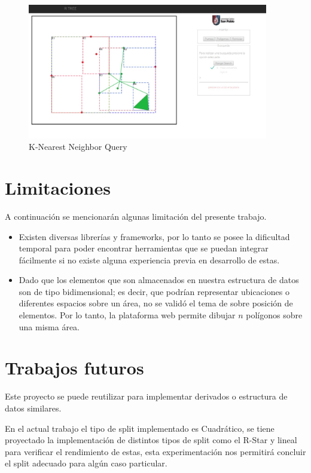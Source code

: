 \documentclass[a4paper]{article}
\begin{document}
\begin{figure}[ht]
\centering
  \includegraphics[width=10.5cm]{images/KNEAR.jpeg}
  \caption{K-Nearest Neighbor Query}
  \label{fig5}
\end{figure}

\newpage

\section{Limitaciones}
A continuación se mencionarán algunas limitación del presente trabajo.\\
\begin{itemize}
    \item Existen diversas librerías y frameworks, por lo tanto se posee la dificultad temporal para poder encontrar herramientas que se puedan integrar fácilmente si no existe alguna experiencia previa en desarrollo de estas.
\end{itemize}

\begin{itemize}
    \item Dado que los elementos que son almacenados en nuestra estructura de datos son de tipo bidimensional; es decir, que podrían representar ubicaciones o diferentes espacios sobre un área, no se validó el tema de sobre posición de elementos. Por lo tanto, la plataforma web permite dibujar $n$ polígonos sobre una misma área.
\end{itemize}
\section{Trabajos futuros}

Este proyecto se puede reutilizar para implementar derivados o estructura de datos similares.

En el actual trabajo el tipo de split implementado es Cuadrático,  se tiene proyectado la implementación de distintos tipos de split  como el R-Star y lineal para verificar el rendimiento de estas, esta experimentación nos permitirá concluir el split adecuado para algún caso particular.
\end{document}
